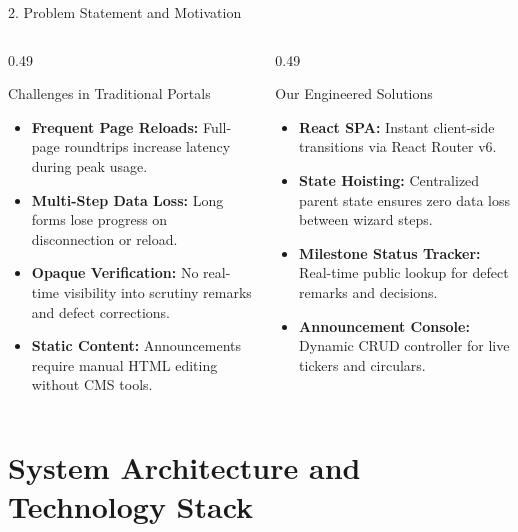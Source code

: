 \documentclass[aspectratio=169, 10pt]{beamer}
\begin{document}
\begin{frame}{2. Problem Statement and Motivation}
  \footnotesize
  \begin{columns}[T,onlytextwidth]
    \begin{column}{0.49\textwidth}
      \begin{alertblock}{Challenges in Traditional Portals}
        \begin{itemize}
          \item \textbf{Frequent Page Reloads:} Full-page roundtrips increase latency during peak usage.
          \item \textbf{Multi-Step Data Loss:} Long forms lose progress on disconnection or reload.
          \item \textbf{Opaque Verification:} No real-time visibility into scrutiny remarks and defect corrections.
          \item \textbf{Static Content:} Announcements require manual HTML editing without CMS tools.
        \end{itemize}
      \end{alertblock}
    \end{column}
    \begin{column}{0.49\textwidth}
      \begin{block}{Our Engineered Solutions}
        \begin{itemize}
          \item \textbf{React SPA:} Instant client-side transitions via React Router v6.
          \item \textbf{State Hoisting:} Centralized parent state ensures zero data loss between wizard steps.
          \item \textbf{Milestone Status Tracker:} Real-time public lookup for defect remarks and decisions.
          \item \textbf{Announcement Console:} Dynamic CRUD controller for live tickers and circulars.
        \end{itemize}
      \end{block}
    \end{column}
  \end{columns}
\end{frame}

\section{System Architecture and Technology Stack}
\end{document}
